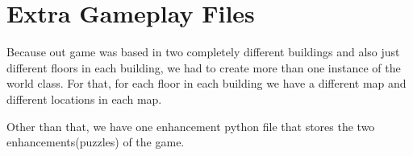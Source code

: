 \documentclass[11pt]{article}
\begin{document}
\section*{Extra Gameplay Files}
Because out game was based in two completely different buildings and also just different floors in each building, we had to create more than one instance of the world class. For that, for each floor in each building we have a different map and different locations in each map. 

Other than that, we have one enhancement python file that stores the two enhancements(puzzles) of the game. 
\end{document}
